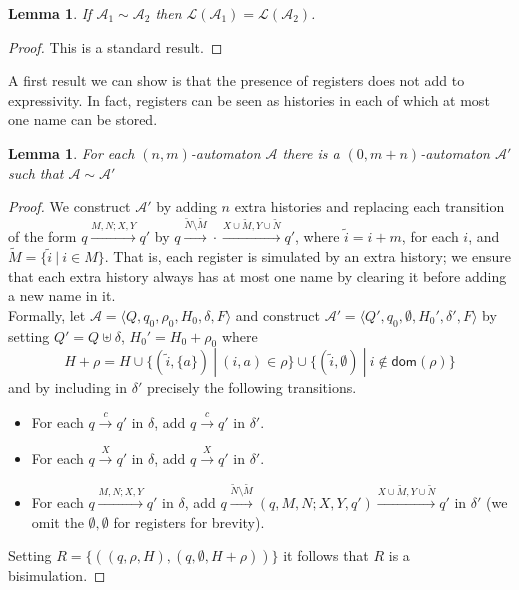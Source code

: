 \documentclass{article}
\newtheorem{lemma}[theorem]{Lemma}
\theoremstyle{definition}
\renewcommand\AA{\mathcal{A}}
\newcommand\LL{\mathcal{L}}
\newcommand\dom{\mathsf{dom}}
\newcommand\ta{,}
\begin{document}
\begin{lemma}\label{l:bisim}
If $\AA_1\sim\AA_2$ then $\LL(\AA_1)=\LL(\AA_2)$.
\end{lemma}
\begin{proof}
This is a standard result.
\end{proof}

A first result we can show is that the presence of registers does not add to expressivity. In fact, registers can be seen as histories in each of which at most one name can be stored.

\newcommand\qwe[1]{\widetilde{#1}}

\begin{lemma}
For each $(n,m)$-automaton $\AA$ there is a
$(0,m{+}n)$-automaton $\AA'$ such that $\AA\sim\AA'$
\end{lemma}
\begin{proof}
We construct $\AA'$ by adding $n$ extra histories and replacing each transition of the form $q\xrightarrow{M\ta N;X\ta Y}q'$ by $q\xrightarrow{\qwe{N}\setminus \qwe{M}}\cdot\xrightarrow{X\cup\qwe{M}\ta Y\cup\qwe{N}}q'$, where $\qwe{i}=i+m$, for each $i$, and $\qwe{M}=\{\qwe{i}\ |\ i\in M\}$. That is, each register is simulated by an extra history; we ensure that each extra history always has at most one name by clearing it before adding a new name in it.
\\
Formally, let $\AA=\langle Q,q_{0},\rho_{0},H_0,\delta,F\rangle$ and construct $\AA'=\langle Q',q_{0},\emptyset,H_0',\delta',F\rangle$ by setting
$Q'=Q\uplus\delta$, $H_0'=H_0+\rho_0$ where 
\[
H+\rho = H\cup \{(\qwe{i},\{a\})\ |\ (i,a)\in\rho\}\cup\{(\qwe{i},\emptyset)\ |\ i\not\in\dom(\rho)\}
\]
and 
by including in $\delta'$ precisely the following transitions.
\begin{itemize}
\item For each $q\xrightarrow{c}q'$ in $\delta$, add $q\xrightarrow{c}q'$ in $\delta'$.
\item For each $q\xrightarrow{X}q'$ in $\delta$, add $q\xrightarrow{X}q'$ in $\delta'$.
\item For each $q\xrightarrow{M\ta N;X\ta Y}q'$ in $\delta$, add $q\xrightarrow{\qwe{N}\setminus\qwe{M}}(q,M\ta N;X\ta Y,q')\xrightarrow{X\cup\qwe{M}\ta Y\cup\qwe{N}}q'$ in $\delta'$ (we omit the $\emptyset\ta \emptyset$ for registers for brevity).
\end{itemize}
Setting $R=\{((q,\rho,H),(q,\emptyset,H+\rho)) \}$ 
it follows that $R$ is a bisimulation.
\end{proof}
\end{document}
